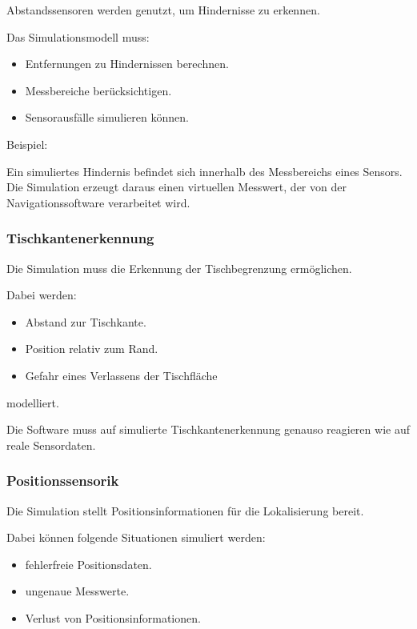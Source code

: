 Abstandssensoren werden genutzt, um Hindernisse zu erkennen.

Das Simulationsmodell muss:

\begin{itemize}
\tightlist
\item
  Entfernungen zu Hindernissen berechnen.
\item
  Messbereiche berücksichtigen.
\item
  Sensorausfälle simulieren können.
\end{itemize}

Beispiel:

Ein simuliertes Hindernis befindet sich innerhalb des Messbereichs eines
Sensors. Die Simulation erzeugt daraus einen virtuellen Messwert, der
von der Navigationssoftware verarbeitet wird.

\subsubsection{Tischkantenerkennung}\label{tischkantenerkennung-1}

Die Simulation muss die Erkennung der Tischbegrenzung ermöglichen.

Dabei werden:

\begin{itemize}
\tightlist
\item
  Abstand zur Tischkante.
\item
  Position relativ zum Rand.
\item
  Gefahr eines Verlassens der Tischfläche
\end{itemize}

modelliert.

Die Software muss auf simulierte Tischkantenerkennung genauso reagieren
wie auf reale Sensordaten.

\subsubsection{Positionssensorik}\label{positionssensorik}

Die Simulation stellt Positionsinformationen für die Lokalisierung
bereit.

Dabei können folgende Situationen simuliert werden:

\begin{itemize}
\tightlist
\item
  fehlerfreie Positionsdaten.
\item
  ungenaue Messwerte.
\item
  Verlust von Positionsinformationen.
\end{itemize}

